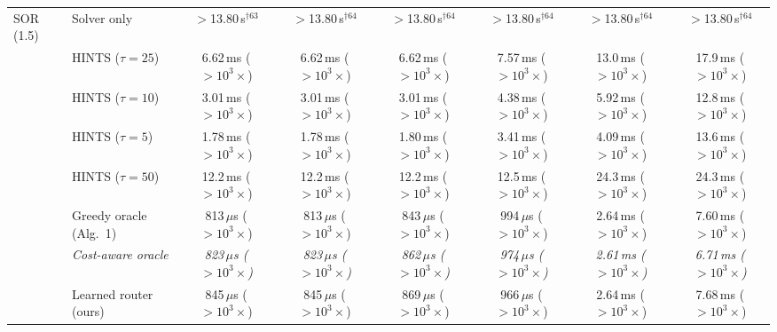 {\begin{tabular}{llcccccc}
\midrule
SOR (1.5) & Solver only & $>$13.80\,s$^{\dagger 63}$ & $>$13.80\,s$^{\dagger 64}$ & $>$13.80\,s$^{\dagger 64}$ & $>$13.80\,s$^{\dagger 64}$ & $>$13.80\,s$^{\dagger 64}$ & $>$13.80\,s$^{\dagger 64}$ \\
 & HINTS ($\tau{=}25$) & 6.62\,ms ($>10^{3}\times$) & 6.62\,ms ($>10^{3}\times$) & 6.62\,ms ($>10^{3}\times$) & 7.57\,ms ($>10^{3}\times$) & 13.0\,ms ($>10^{3}\times$) & 17.9\,ms ($>10^{3}\times$) \\
 & HINTS ($\tau{=}10$) & 3.01\,ms ($>10^{3}\times$) & 3.01\,ms ($>10^{3}\times$) & 3.01\,ms ($>10^{3}\times$) & 4.38\,ms ($>10^{3}\times$) & 5.92\,ms ($>10^{3}\times$) & 12.8\,ms ($>10^{3}\times$) \\
 & HINTS ($\tau{=}5$) & 1.78\,ms ($>10^{3}\times$) & 1.78\,ms ($>10^{3}\times$) & 1.80\,ms ($>10^{3}\times$) & 3.41\,ms ($>10^{3}\times$) & 4.09\,ms ($>10^{3}\times$) & 13.6\,ms ($>10^{3}\times$) \\
 & HINTS ($\tau{=}50$) & 12.2\,ms ($>10^{3}\times$) & 12.2\,ms ($>10^{3}\times$) & 12.2\,ms ($>10^{3}\times$) & 12.5\,ms ($>10^{3}\times$) & 24.3\,ms ($>10^{3}\times$) & 24.3\,ms ($>10^{3}\times$) \\
 & Greedy oracle (Alg.~1) & 813\,$\mu$s ($>10^{3}\times$) & 813\,$\mu$s ($>10^{3}\times$) & 843\,$\mu$s ($>10^{3}\times$) & 994\,$\mu$s ($>10^{3}\times$) & 2.64\,ms ($>10^{3}\times$) & 7.60\,ms ($>10^{3}\times$) \\
 & \textit{Cost-aware oracle} & \textit{823\,$\mu$s ($>10^{3}\times$)} & \textit{823\,$\mu$s ($>10^{3}\times$)} & \textit{862\,$\mu$s ($>10^{3}\times$)} & \textit{974\,$\mu$s ($>10^{3}\times$)} & \textit{2.61\,ms ($>10^{3}\times$)} & \textit{6.71\,ms ($>10^{3}\times$)} \\
 & Learned router (ours) & 845\,$\mu$s ($>10^{3}\times$) & 845\,$\mu$s ($>10^{3}\times$) & 869\,$\mu$s ($>10^{3}\times$) & 966\,$\mu$s ($>10^{3}\times$) & 2.64\,ms ($>10^{3}\times$) & 7.68\,ms ($>10^{3}\times$) \\
\bottomrule
\end{tabular}}
